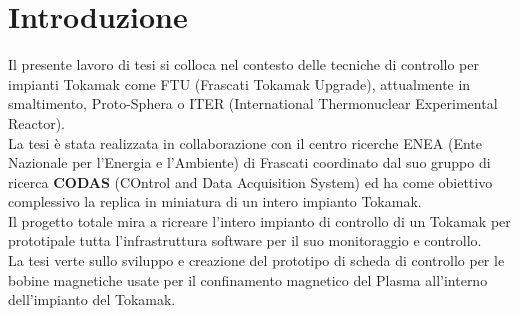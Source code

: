 \chapter*{Introduzione}
Il presente lavoro di tesi si colloca nel contesto delle tecniche di controllo per impianti Tokamak come FTU (Frascati Tokamak Upgrade), attualmente in smaltimento, Proto-Sphera o ITER (International Thermonuclear Experimental Reactor).\\
La tesi è stata realizzata in collaborazione con il centro ricerche ENEA (Ente Nazionale per l’Energia e l’Ambiente) di Frascati coordinato dal suo gruppo di ricerca \textbf{CODAS} (COntrol and Data Acquisition System) ed ha come obiettivo complessivo la replica in miniatura di un intero impianto Tokamak.\\
Il progetto totale mira a ricreare l'intero impianto di controllo di un Tokamak per prototipale tutta l'infrastruttura software per il suo monitoraggio e controllo.\\
La tesi verte sullo sviluppo e creazione del prototipo di scheda di controllo per le bobine magnetiche usate per il confinamento magnetico del Plasma all'interno dell'impianto del Tokamak.

